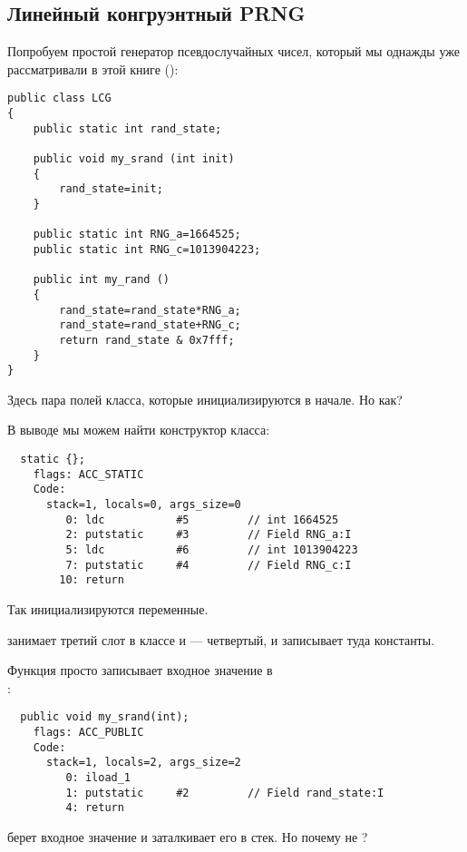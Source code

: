 \subsection{Линейный конгруэнтный \ac{PRNG}}


Попробуем простой генератор псевдослучайных чисел, 
который мы однажды уже рассматривали в этой книге ():

\begin{lstlisting}[style=customjava]
public class LCG 
{
	public static int rand_state;

	public void my_srand (int init)
	{
		rand_state=init;
	}

	public static int RNG_a=1664525;
	public static int RNG_c=1013904223;

	public int my_rand ()
	{
		rand_state=rand_state*RNG_a;
		rand_state=rand_state+RNG_c;
		return rand_state & 0x7fff;
	}
}
\end{lstlisting}


Здесь пара полей класса, которые инициализируются в начале.
Но как?

В выводе  мы можем найти конструктор класса:

\begin{lstlisting}
  static {};
    flags: ACC_STATIC
    Code:
      stack=1, locals=0, args_size=0
         0: ldc           #5         // int 1664525
         2: putstatic     #3         // Field RNG_a:I
         5: ldc           #6         // int 1013904223
         7: putstatic     #4         // Field RNG_c:I
        10: return        
\end{lstlisting}


Так инициализируются переменные.

 занимает третий слот в классе и  --- четвертый, 
и  записывает туда константы.


Функция  просто записывает входное значение в \\ 
:

\begin{lstlisting}
  public void my_srand(int);
    flags: ACC_PUBLIC
    Code:
      stack=1, locals=2, args_size=2
         0: iload_1       
         1: putstatic     #2         // Field rand_state:I
         4: return        
\end{lstlisting}


 берет входное значение и заталкивает его в стек. Но почему не ?


